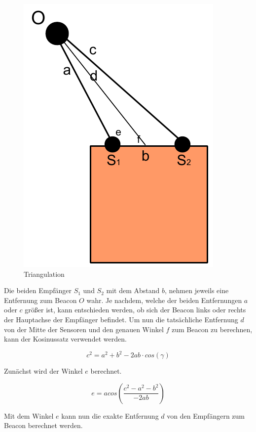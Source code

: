 \begin{figure}[htbp]
  \centering
  \includegraphics{figures/triangulation.pdf}
  \caption{Triangulation}
\end{figure}

Die beiden Empfänger $S_1$ und $S_2$ mit dem Abstand $b$, nehmen jeweils eine
Entfernung zum Beacon $O$ wahr. Je nachdem, welche der beiden
Entfernungen $a$ oder $c$ größer ist, kann entschieden werden, ob
sich der Beacon links oder rechts der Hauptachse der Empfänger
befindet. Um nun die tatsächliche Entfernung $d$ von der Mitte der
Sensoren und den genauen Winkel $f$ zum Beacon zu berechnen, kann der
Kosinussatz verwendet werden.

\begin{equation}
  c^2 = a^2 + b^2 - 2ab\cdot cos(\gamma)
\end{equation}

Zunächst wird der Winkel $e$ berechnet.

\begin{equation}
  e = acos\left(\frac{c^2 - a^2 - b^2}{-2ab}\right)
\end{equation}

Mit dem Winkel $e$ kann nun die exakte Entfernung $d$ von den Empfängern
zum Beacon berechnet werden.


